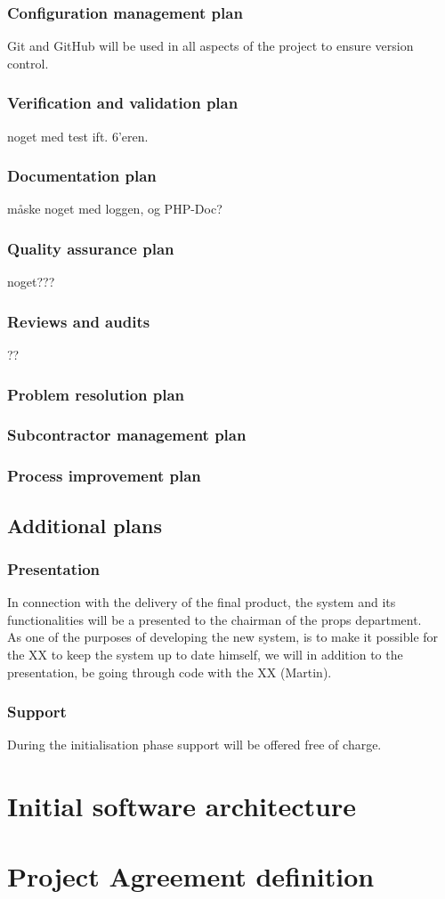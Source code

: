 \documentclass[12pt]{article}
\begin{document}
\subsubsection{Configuration management plan}
Git and GitHub will be used in all aspects of the project to ensure version control.
\subsubsection{Verification and validation plan}
noget med test ift. 6'eren.
\subsubsection{Documentation plan}
måske noget med loggen, og PHP-Doc?
\subsubsection{Quality assurance plan}
noget???
\subsubsection{Reviews and audits}
??
\subsubsection{Problem resolution plan}
\subsubsection{Subcontractor management plan}
\subsubsection{Process improvement plan}
\subsection{Additional plans}
\subsubsection{Presentation}
In connection with the delivery of the final product, the system and its functionalities will be a presented to the chairman of the props department. \\
As one of the purposes of developing the new system, is to make it possible for the XX to keep the system up to date himself, we will in addition to the presentation, be going through code with the XX (Martin).
\subsubsection{Support}
During the initialisation phase support will be offered free of charge.
\section{Initial software architecture} 
\section{Project Agreement definition}
\end{document}
